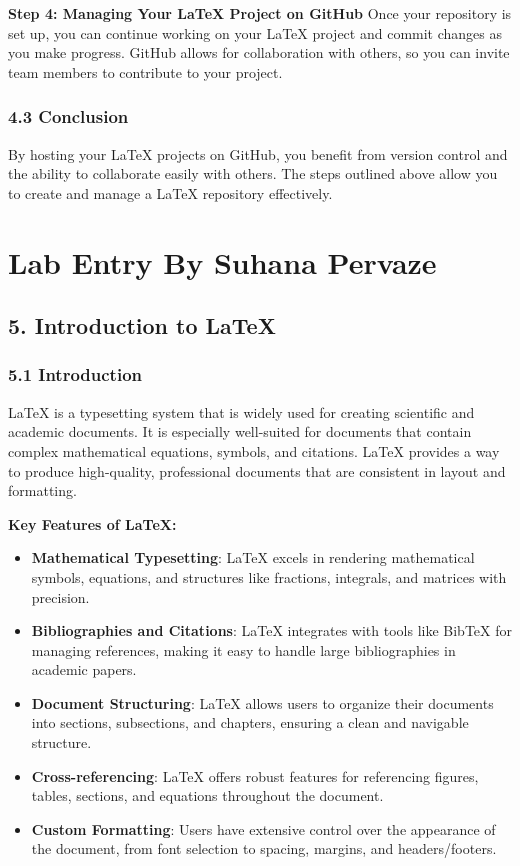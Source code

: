 \documentclass[a4paper,12pt]{article}
\begin{document}
\textbf{Step 4: Managing Your LaTeX Project on GitHub}
Once your repository is set up, you can continue working on your LaTeX project and commit changes as you make progress. GitHub allows for collaboration with others, so you can invite team members to contribute to your project.

\subsubsection*{4.3 Conclusion}
By hosting your LaTeX projects on GitHub, you benefit from version control and the ability to collaborate easily with others. The steps outlined above allow you to create and manage a LaTeX repository effectively.

\newpage
\section*{Lab Entry By Suhana Pervaze}
\subsection*{5. Introduction to LaTeX}

\subsubsection*{5.1 Introduction}
LaTeX is a typesetting system that is widely used for creating scientific and academic documents. It is especially well-suited for documents that contain complex mathematical equations, symbols, and citations. LaTeX provides a way to produce high-quality, professional documents that are consistent in layout and formatting.

\textbf{Key Features of LaTeX:}
\begin{itemize}
    \item \textbf{Mathematical Typesetting}: LaTeX excels in rendering mathematical symbols, equations, and structures like fractions, integrals, and matrices with precision.
    \item \textbf{Bibliographies and Citations}: LaTeX integrates with tools like BibTeX for managing references, making it easy to handle large bibliographies in academic papers.
    \item \textbf{Document Structuring}: LaTeX allows users to organize their documents into sections, subsections, and chapters, ensuring a clean and navigable structure.
    \item \textbf{Cross-referencing}: LaTeX offers robust features for referencing figures, tables, sections, and equations throughout the document.
    \item \textbf{Custom Formatting}: Users have extensive control over the appearance of the document, from font selection to spacing, margins, and headers/footers.
\end{itemize}
\end{document}
